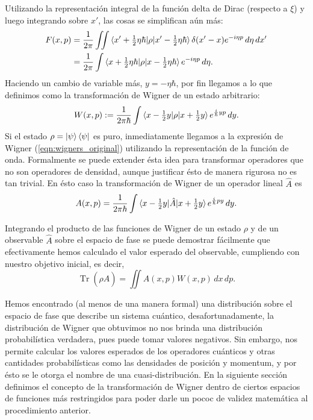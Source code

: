 \documentclass[a4paper]{report}
\DeclareMathOperator{\Tr}{Tr}
\begin{document}
  Utilizando la representación integral de la función delta
  de Dirac (respecto a $\xi$) y luego integrando sobre $x'$,
  las cosas se simplifican aún más:
  \begin{align}
    F(x,p)
    &= \frac{1}{2\pi} \iint \braket{
    x'+\tfrac{1}{2}\eta\hbar | \rho|
    x'-\tfrac{1}{2}\eta\hbar} \delta(x'-x) e^{-i\eta p} \,
    d\eta \, dx' \\
    &= \frac{1}{2 \pi} \int \braket{x +
    \tfrac{1}{2}\eta\hbar | \rho | x - \tfrac{1}{2}
    \eta\hbar}e^{-i \eta p} \, d\eta.
  \end{align}
  Haciendo un cambio de variable más, $y = -\eta \hbar$, por
  fin llegamos a lo que definimos como la transformación de
  Wigner de un estado arbitrario:
  \begin{equation}
    W(x,p)
    := \frac{1}{2\pi\hbar} \int \braket{x -
      \tfrac{1}{2}y|\rho|x+\tfrac{1}{2}y} e^{\frac{i}{\hbar}
    y p} \, dy.
  \end{equation}
  Si el estado $\rho = \ket \psi \bra \psi$ es puro,
  inmediatamente llegamos a la expresión de Wigner
  (\ref{eqn:wigners_original}) utilizando la representación
  de la función de onda. Formalmente se puede extender ésta
  idea para transformar operadores que no son operadores de
  densidad, aunque justificar ésto de manera rigurosa no es
  tan trivial. En ésto caso la transformación de Wigner de
  un operador lineal $\hat{A}$ es
  \begin{equation}
    A(x,p)
    = \frac{1}{2 \pi \hbar} \int
    \braket{x-\tfrac{1}{2}y|\hat{A}|x+\tfrac{1}{2}y}
    e^{\frac{i}{\hbar}p y} \, dy.
  \end{equation}

  Integrando el producto de las funciones de Wigner de un
  estado $\rho$ y de un observable $\hat{A}$ sobre el
  espacio de fase se puede demostrar fácilmente que
  efectivamente hemos calculado el valor esperado del
  observable, cumpliendo con nuestro objetivo inicial, es
  decir,
  \[
    \Tr\left( \rho\hat{A} \right) 
    = \iint A(x,p)W(x,p) \, dx \, dp.
  \] 

  Hemos encontrado (al menos de una manera formal) una
  distribución sobre el espacio de fase que describe un
  sistema cuántico, desafortunadamente, la distribución de
  Wigner que obtuvimos no nos brinda una distribución
  probabilística verdadera, pues puede tomar valores
  negativos. Sin embargo, nos permite calcular los valores
  esperados de los operadores cuánticos y otras cantidades
  probabilísticas como las densidades de posición y
  momentum, y por ésto se le otorga el nombre de una
  cuasi-distribución. En la siguiente sección definimos el
  concepto de la transformación de Wigner dentro de ciertos
  espacios de funciones más restringidos para poder darle un
  pococ de validez matemática al procedimiento anterior.
\end{document}
